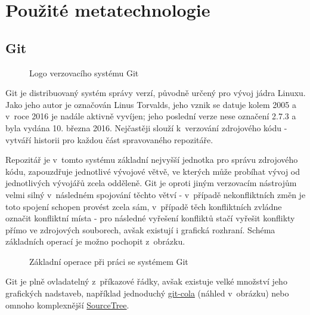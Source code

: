 \section{Použité metatechnologie}

\subsection{Git}
\label{subsec:git}

\begin{figure}
 \centering
 
 \caption{Logo verzovacího systému Git}
\end{figure}

Git je distribuovaný systém správy verzí, původně určený pro vývoj jádra Linuxu. Jako jeho autor je označován Linus Torvalds, jeho vznik se datuje kolem 2005 a v~roce 2016 je nadále aktivně vyvíjen; jeho poslední verze nese označení 2.7.3 a byla vydána 10. března 2016. Nejčastěji slouží k~verzování zdrojového kódu - vytváří historii pro každou část spravovaného repozitáře.

Repozitář je v~tomto systému základní nejvyšší jednotka pro správu zdrojového kódu, zapouzdřuje jednotlivé vývojové větvě, ve kterých může probíhat vývoj od jednotlivých vývojářů zcela odděleně. Git je oproti jiným verzovacím nástrojům velmi silný v~následném spojování těchto větví - v~případě nekonfliktních změn je toto spojení schopen provést zcela sám, v~případě těch konfliktních zvládne označit konfliktní místa - pro následné vyřešení konfliktů stačí vyřešit konflikty přímo ve zdrojových souborech, avšak existují i grafická rozhraní. Schéma základních operací je možno pochopit z~obrázku.

\begin{figure}[H]
 	\centering
 	
 	\caption{Základní operace při práci se systémem Git}
 	\label{fig:git-operations}
\end{figure}

Git je plně ovladatelný z~příkazové řádky, avšak existuje velké množství jeho grafických nadstaveb, například jednoduchý \href{http://git-cola.github.io/}{git-cola} (náhled v~obrázku) nebo omnoho komplexnější \href{https://www.sourcetreeapp.com/}{SourceTree}.

